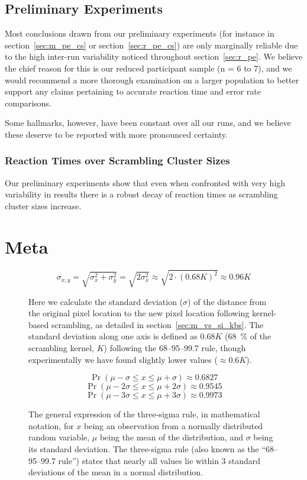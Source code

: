     \section{Preliminary Experiments}\label{sec:d_pe}
	Most conclusions drawn from our preliminary experiments (for instance in section~\ref{sec:m_pe_cs} or section~\ref{sec:r_pe_cs}) are only marginally reliable due to the high inter-run variability noticed throughout section~\ref{sec:r_pe}.
	We believe the chief reason for this is our reduced participant sample (n = 6 to 7), and we would recommend a more thorough examination on a larger population to better support any claims pertaining to accurate reaction time and error rate comparisons.
	
	Some hallmarks, however, have been constant over all our runs, and we believe these deserve to be reported with more pronounced certainty.
	\subsection{Reaction Times over Scrambling Cluster Sizes}
	    Our preliminary experiments show that even when confronted with very high variability in results there is a robust decay of reaction times as scrambling cluster sizes increase. 
\chapter{Meta}
    \begin{figure}[H]
	\[ \sigma_{x,y} = \sqrt{\sigma_{x}^{2}+\sigma_{y}^{2}} = \sqrt{2\sigma_{x}^{2}} \approx \sqrt{2 \cdot (0.68 K)^{2}} \approx 0.96K\]
	\caption{Here we calculate the standard deviation ($\sigma$) of the distance from the original pixel location to the new pixel location following kernel-based scrambling, as detailed in section~\ref{sec:m_vs_si_kbs}. The standard deviation along one axis is defined as $0.68K$ (\SI{68}{\percent} of the scrambling kernel, $K$) following the 68–95–99.7 rule, though experimentally we have found slightly lower values ($\approx 0.6K$).}\label{eq:lrgn}
    \end{figure}
    \begin{figure}[H]
	\[\Pr(\mu - \sigma \le x \le \mu + \sigma) \approx 0.6827 \]
	\[\Pr(\mu - 2\sigma \le x \le \mu + 2\sigma) \approx 0.9545 \]
	\[\Pr(\mu - 3\sigma \le x \le \mu + 3\sigma) \approx 0.9973 \]
	\caption{The general expression of the three-sigma rule, in mathematical notation, for $x$ being an observation from a normally distributed random variable, $\mu$ being the mean of the distribution, and $\sigma$ being its standard deviation. The three-sigma rule (also known as the “68–95–99.7 rule”) states that nearly all values lie within 3 standard deviations of the mean in a normal distribution.}\label{eq:3s}
    \end{figure}

